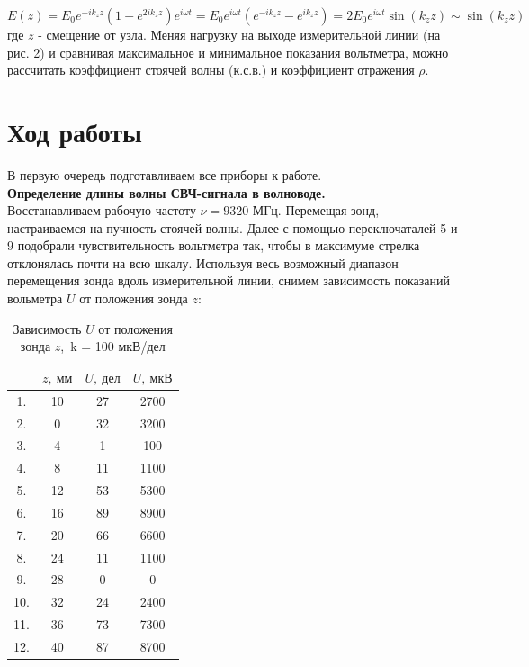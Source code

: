 \documentclass[a4paper,12pt]{article}
\begin{document}
\begin{equation}
    E(z) = E_0 e^{-i k_z z} (1 - e^{2 i k_z z}) e^{i \omega t} = E_0 e^{i \omega t} (e^{-i k_z z} - e^{i k_z z}) = 2 E_0 e^{i \omega t} \sin (k_z z) \sim \sin (k_z z)
\end{equation}
где $z$ - смещение от узла. Меняя нагрузку на выходе измерительной линии (на рис. 2) и сравнивая максимальное и минимальное показания вольтметра, можно рассчитать коэффициент стоячей волны (к.с.в.) и коэффициент отражения $\rho$.






\section*{Ход работы}
В первую очередь подготавливаем все приборы к работе. \\

\textbf{Определение длины волны СВЧ-сигнала в волноводе.}\\
Восстанавливаем рабочую частоту $\nu = 9320$ МГц. Перемещая зонд, настраиваемся на пучность стоячей волны. Далее с помощью переключаталей 5 и 9 подобрали чувствительность вольтметра так, чтобы в максимуме стрелка отклонялась почти на всю шкалу. Используя весь возможный диапазон перемещения зонда вдоль измерительной линии, снимем зависимость показаний вольметра $U$ от положения зонда $z$:

\begin{table}[H]

    \centering
	\begin{tabular}{|c|c|c|c|}
		\hline
		\text{№} & $z,\ \text{мм}$ & $U,\ \text{дел}$ &  $U,\ \text{мкВ}$ \\
		\hline
		1.  & 10 & 27 & 2700 \\
		2.  & 0 & 32 & 3200 \\
		3.  & 4 & 1 & 100 \\
		4.  & 8 & 11  & 1100 \\
		5.  & 12 & 53  & 5300 \\
		6.  & 16 & 89  & 8900 \\
		7.  & 20 & 66 & 6600 \\
		8.  & 24 & 11 & 1100 \\
		9.  & 28 & 0 & 0 \\
        10. & 32 & 24 & 2400 \\
        11. & 36 & 73 & 7300 \\
        12. & 40 & 87 & 8700 \\
		\hline
	\end{tabular}
 \caption{Зависимость $U$ от положения зонда $z$,\ k = 100 мкВ/дел}
\end{table}\\
\end{document}
